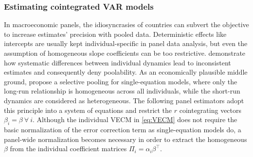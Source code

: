 \subsubsection{Estimating cointegrated VAR models}
In macroeconomic panels, the idiosyncrasies of countries can subvert the objective to increase estimates' precision with pooled data. Deterministic effects like intercepts are usually kept individual-specific in panel data analysis, but even the assumption of homogeneous slope coefficients can be too restrictive. \citet{PesaranSmith1995} demonstrate how systematic differences between individual dynamics lead to inconsistent estimates and consequently deny poolability. As an economically plausible middle ground, \citet{PesaranEtAl1999} propose a selective pooling for single-equation models, where only the long-run relationship is homogeneous across all individuals, while the short-run dynamics are considered as heterogeneous. The following panel estimators adopt this principle into a system of equations and restrict the $ r $ cointegrating vectors $ \beta_i = \beta \ \forall \ i $. Although the individual VECM in \eqref{eq:VECM} does not require the basic normalization of the error correction term as single-equation models do, a panel-wide normalization becomes necessary in order to extract the homogeneous $ \beta $ from the individual coefficient matrices $ \Pi_i = \alpha_i \beta^\top $.



